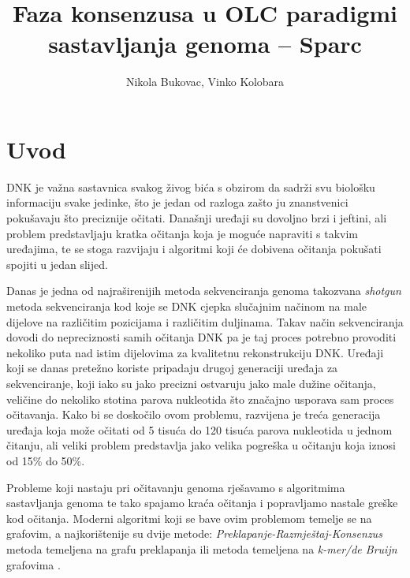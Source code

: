 \documentclass[times, utf8, seminar, numeric]{fer}
\begin{document}
\nocite{*}

\title{Faza konsenzusa u OLC paradigmi sastavljanja genoma – Sparc}

\author{Nikola Bukovac, Vinko Kolobara}


\maketitle

\tableofcontents

\chapter{Uvod}
DNK je važna sastavnica svakog živog bića s obzirom da sadrži svu biološku informaciju svake jedinke, što je jedan od razloga zašto ju znanstvenici pokušavaju što preciznije očitati. Današnji uređaji su dovoljno brzi i jeftini, ali problem predstavljaju kratka očitanja koja je moguće napraviti s takvim uređajima, te se stoga razvijaju i algoritmi koji će dobivena očitanja pokušati spojiti u jedan slijed.

Danas je jedna od najraširenijih metoda sekvenciranja genoma takozvana \emph{shotgun} metoda sekvenciranja kod koje se DNK cjepka slučajnim načinom na male dijelove na različitim pozicijama i različitim duljinama. Takav način sekvenciranja dovodi do nepreciznosti samih očitanja DNK pa je taj proces potrebno provoditi nekoliko puta nad istim dijelovima za kvalitetnu rekonstrukciju DNK. Uređaji koji se danas pretežno koriste pripadaju drugoj generaciji uređaja za sekvenciranje, koji iako su jako precizni ostvaruju jako male dužine očitanja, veličine do nekoliko stotina parova nukleotida što značajno usporava sam proces očitavanja. Kako bi se doskočilo ovom problemu, razvijena je treća generacija uređaja koja može očitati od 5 tisuća do 120 tisuća parova nukleotida u jednom čitanju, ali veliki problem predstavlja jako velika pogreška u očitanju koja iznosi od 15\% do 50\%.

Probleme koji nastaju pri očitavanju genoma rješavamo s algoritmima sastavljanja genoma te tako spajamo kraća očitanja i popravljamo nastale greške kod očitanja. Moderni algoritmi koji se bave ovim problemom temelje se na grafovim, a najkorištenije su dvije metode: \emph{Preklapanje-Razmještaj-Konsenzus} metoda temeljena na grafu preklapanja ili metoda temeljena na \emph{k-mer/de Bruijn} grafovima \cite{sikic2013bioinformatika}.
\end{document}
